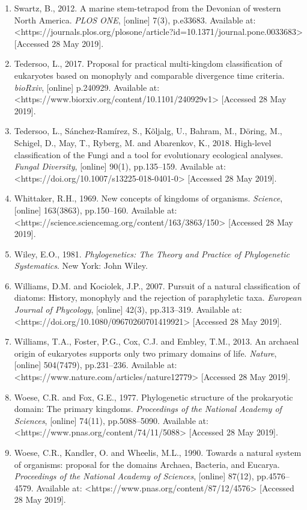 \documentclass[a4paper]{article}
\begin{document}
\begin{enumerate}
.
\item Swartz, B., 2012. A marine stem-tetrapod from the Devonian of western North America. \textit{PLOS ONE}, [online]
7(3), p.e33683. Available at:
{\textless}https://journals.plos.org/plosone/article?id=10.1371/journal.pone.0033683{\textgreater} [Accessed 28 May
2019].
\item Tedersoo, L., 2017. Proposal for practical multi-kingdom classification of eukaryotes based on monophyly and
comparable divergence time criteria. \textit{bioRxiv}, [online] p.240929. Available at:
{\textless}https://www.biorxiv.org/content/10.1101/240929v1{\textgreater} [Accessed 28 May 2019].
\item Tedersoo, L., Sánchez-Ramírez, S., Kõljalg, U., Bahram, M., Döring, M., Schigel, D., May, T., Ryberg, M. and
Abarenkov, K., 2018. High-level classification of the Fungi and a tool for evolutionary ecological analyses.
\textit{Fungal Diversity}, [online] 90(1), pp.135–159. Available at:
{\textless}https://doi.org/10.1007/s13225-018-0401-0{\textgreater} [Accessed 28 May 2019].
\item Whittaker, R.H., 1969. New concepts of kingdoms of organisms. \textit{Science}, [online] 163(3863), pp.150–160.
Available at: {\textless}https://science.sciencemag.org/content/163/3863/150{\textgreater} [Accessed 28 May 2019].
\item Wiley, E.O., 1981. \textit{Phylogenetics: The Theory and Practice of Phylogenetic Systematics}. New York: John
Wiley.
\item Williams, D.M. and Kociolek, J.P., 2007. Pursuit of a natural classification of diatoms: History, monophyly and
the rejection of paraphyletic taxa. \textit{European Journal of Phycology}, [online] 42(3), pp.313–319. Available at:
{\textless}https://doi.org/10.1080/09670260701419921{\textgreater} [Accessed 28 May 2019].
\item Williams, T.A., Foster, P.G., Cox, C.J. and Embley, T.M., 2013. An archaeal origin of eukaryotes supports only two
primary domains of life. \textit{Nature}, [online] 504(7479), pp.231–236. Available at:
{\textless}https://www.nature.com/articles/nature12779{\textgreater} [Accessed 28 May 2019].
\item Woese, C.R. and Fox, G.E., 1977. Phylogenetic structure of the prokaryotic domain: The primary kingdoms.
\textit{Proceedings of the National Academy of Sciences}, [online] 74(11), pp.5088–5090. Available at:
{\textless}https://www.pnas.org/content/74/11/5088{\textgreater} [Accessed 28 May 2019].
\item Woese, C.R., Kandler, O. and Wheelis, M.L., 1990. Towards a natural system of organisms: proposal for the domains
Archaea, Bacteria, and Eucarya. \textit{Proceedings of the National Academy of Sciences}, [online] 87(12),
pp.4576–4579. Available at: {\textless}https://www.pnas.org/content/87/12/4576{\textgreater} [Accessed 28 May 2019].
\end{enumerate}
\end{document}
